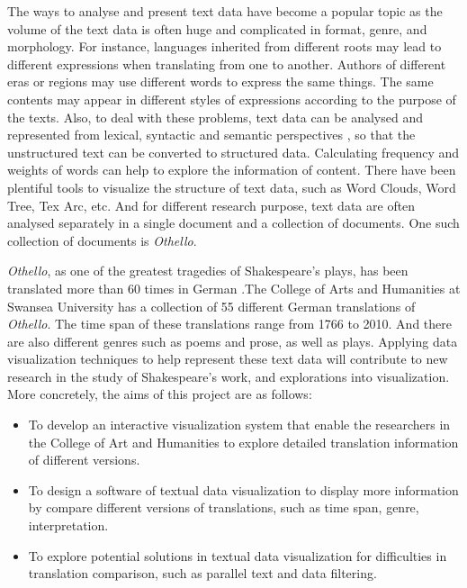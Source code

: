 The ways to analyse and present text data have become a popular topic as the volume of the text data is often huge and complicated in format, genre, and morphology. For instance, languages inherited from different roots may lead to different expressions when translating from one to another. Authors of different eras or regions may use different words to express the same things. The same contents may appear in different styles of expressions according to the purpose of the texts. Also, to deal with these problems, text data can be analysed and represented from lexical, syntactic and semantic perspectives \cite{Ward2015}, so that the unstructured text can be converted to structured data. Calculating frequency and weights of words can help to explore the information of content. There have been plentiful tools to visualize the structure of text data, such as Word Clouds, Word Tree, Tex Arc, etc. And for different research purpose, text data are often analysed separately in a single document and a collection of documents. One such collection of documents is \emph{Othello}.

\emph{Othello}, as one of the greatest tragedies of Shakespeare's plays, has been translated more than 60 times in German  \cite{Geng2011}.The College of Arts and Humanities at Swansea University has a collection of 55 different German translations of \emph{Othello}. The time span of these translations range from 1766 to 2010. And there are also different genres such as poems and prose, as well as plays. Applying data visualization techniques to help represent these text data will contribute to new research in the study of Shakespeare's work, and explorations into visualization. More concretely, the aims of this project are as follows:

\begin{itemize}
	\item \textbf{}To develop an interactive visualization system that enable the researchers in the College of Art and Humanities to explore detailed translation information of different versions.
	\item \textbf{} To design a software of textual data visualization to display more information by compare different versions of translations, such as time span, genre, interpretation.
	\item \textbf{} To explore potential solutions in textual data visualization for difficulties in translation comparison, such as parallel text and data filtering.
\end{itemize}

